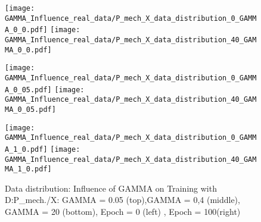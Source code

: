 \begin{comment}
\begin{figure}[H]
  \centering
  \texttt{[image: accuracy\_real\_world]}
  \caption {Source and Target Accuracies for model training with Regular FC + CNN MMD loss (left), Regular FC MMD (middle) and No MMD loss (right)} \label{fig:accuracy_real_world}
\end{figure}


\begin{figure}[H]
  \centering
  \texttt{[image: loss\_real\_world]}
  \caption {Loss for model training with Regular FC + CNN MMD loss (left), Regular FC MMD (middle) and No MMD loss} \label{fig:loss_real_world}
\end{figure}


In fig. the development of the source domain cross entropy MMD loss is shown. It can be seen, that the hyperparameter GAMMA was picked well, such that the MMD as well as the source cross entropy loss were able to be reduced smoothly throughout the trainings process. 


Unfortunately the MMD loss could just minimize the domain discrepancy by a little. The domain discrepancy problem couldn't be solved completely. Still the idea of the MMD loss becomes more clear in the experiments. Also the positive effect of the MMD loss for the training is obvious. For the complex multi-dimensional dataset the MMD loss is probably not sophisticated enough to detect and effectively fight the domain discrepancy.
\end{comment}

\begin{figure}[H]
  \centering

  \texttt{[image: GAMMA\_Influence\_real\_data/P\_mech\_X\_data\_distribution\_0\_GAMMA\_0\_0.pdf]}
  \hspace{.4cm}
  \texttt{[image: GAMMA\_Influence\_real\_data/P\_mech\_X\_data\_distribution\_40\_GAMMA\_0\_0.pdf]}

  \vspace{.1cm}

  \texttt{[image: GAMMA\_Influence\_real\_data/P\_mech\_X\_data\_distribution\_0\_GAMMA\_0\_05.pdf]}
  \hspace{.4cm}
  \texttt{[image: GAMMA\_Influence\_real\_data/P\_mech\_X\_data\_distribution\_40\_GAMMA\_0\_05.pdf]}

  \vspace{.1cm}

  \texttt{[image: GAMMA\_Influence\_real\_data/P\_mech\_X\_data\_distribution\_0\_GAMMA\_1\_0.pdf]}
  \hspace{.4cm}
  \texttt{[image: GAMMA\_Influence\_real\_data/P\_mech\_X\_data\_distribution\_40\_GAMMA\_1\_0.pdf]}

  \vspace{.1cm}

  \caption{Data  distribution:  Influence  of  GAMMA  on  Training with D:P\_mech./X:  GAMMA  =  0.05  (top),GAMMA = 0,4 (middle), GAMMA = 20 (bottom), Epoch = 0 (left) , Epoch = 100(right)}
  \label{fig:distribution_GAMMA_influence_real_data}
\end{figure}




